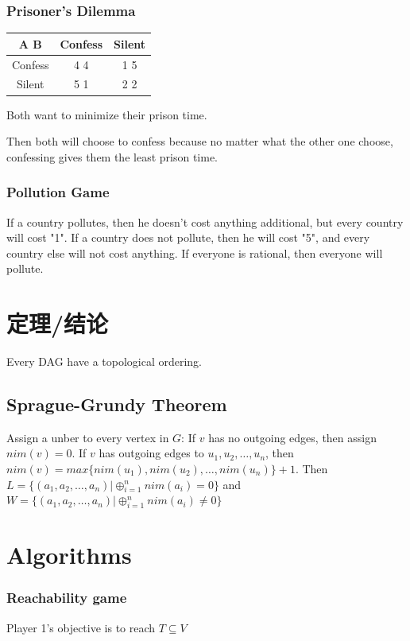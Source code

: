 \documentclass[12pt,a4paper]{ctexrep}
\begin{document}
\subsubsection{Prisoner's Dilemma}
\begin{center}
\begin{tabular}{|c|c|c|}
\hline
A  B & Confess & Silent\\
\hline
Confess & 4 4 & 1 5 \\
\hline
Silent & 5 1 & 2 2 \\
\hline

\end{tabular}
Both want to minimize their prison time.
\end{center}
Then both will choose to confess because no matter what the other one choose, confessing gives them the least prison time.

\subsubsection{Pollution Game}
If a country pollutes, then he doesn't cost anything additional, but every country will cost "1". If a country does not pollute, then he will cost "5", and every country else will not cost anything. If everyone is rational, then everyone will pollute.

\section{定理/结论}
Every DAG have a topological ordering.

\subsection{Sprague-Grundy Theorem}
Assign a unber to every vertex in $G$: If $v$ has no outgoing edges, then assign $nim(v) = 0$. If $v$ has outgoing edges to $u_1,u_2,\dots,u_n$, then $nim(v) = max\{nim(u_1),nim(u_2),\dots, nim(u_n)\}+1$. Then $L = \{(a_1,a_2,\dots,a_n)|\oplus_{i=1}^n nim(a_i) = 0\}$ and $W = \{(a_1,a_2,\dots,a_n)|\oplus_{i=1}^n nim(a_i) \neq 0\}$

\section{Algorithms}
\subsubsection{Reachability game}
Player 1's objective is to reach $T \subseteq V$
\end{document}
